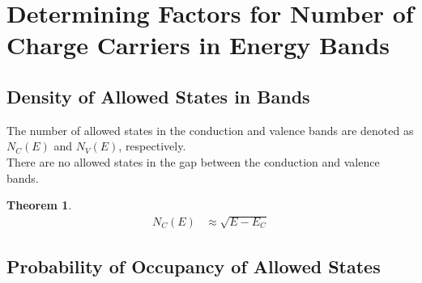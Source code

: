 \documentclass[titlepage, fleqn, a4paper, 12pt, twoside]{article}
\theoremstyle{definition}
\theoremstyle{theorem}
\newtheorem{theorem}{Theorem}
\begin{document}
\section{Determining Factors for Number of Charge Carriers in Energy Bands}

\subsection{Density of Allowed States in Bands}

The number of allowed states in the conduction and valence bands are denoted as $N_C(E)$ and $N_V(E)$, respectively.\\
There are no allowed states in the gap between the conduction and valence bands.

\begin{theorem}
	\begin{align*}
		N_C(E) & \approx \sqrt{E - E_C}
	\end{align*}
\end{theorem}

\subsection{Probability of Occupancy of Allowed States}
\end{document}
